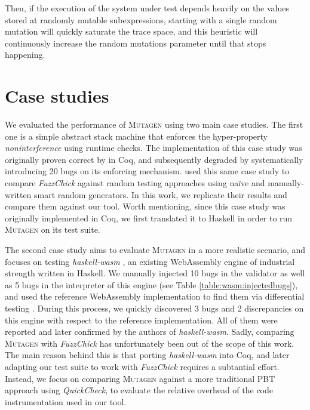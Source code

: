 \documentclass[acmsmall, anonymous]{acmart}
\newcommand{\quickcheck}{\textit{QuickCheck}\xspace}
\newcommand{\fuzzchick}{\textit{FuzzChick}\xspace}
\newcommand{\mutagen}{\textsc{Mutagen}\xspace}
\begin{document}
Then, if the execution of the system under test depends heavily on the values
stored at randomly mutable subexpressions, starting with a single random
mutation will quickly saturate the trace space, and this heuristic will
continuously increase the random mutations parameter until that stops happening.





\section{Case studies}
\label{sec:casestudies}

We evaluated the performance of \mutagen using two main case studies.
%
The first one is a simple abstract stack machine that enforces the
hyper-property \emph{noninterference} \cite{goguen1982security} using runtime
checks.
%
The implementation of this case study was originally proven correct by
\citeauthor{10.1145/2578855.2535839} \citeyearpar{10.1145/2578855.2535839} in
Coq, and subsequently degraded by systematically introducing 20 bugs on its
enforcing mechanism.
%
\citeauthor{lampropoulos2019coverage} used this same case study to compare
\fuzzchick against random testing approaches using na\"ive and manually-written
smart random generators.
%
In this work, we replicate their results and compare them against our tool.
%
Worth mentioning, since this case study was originally implemented in Coq, we
first translated it to Haskell in order to run \mutagen on its test suite.


The second case study aims to evaluate \mutagen in a more realistic scenario,
and focuses on testing \textit{haskell-wasm} \cite{haskellwasm}, an existing
WebAssembly engine of industrial strength written in Haskell.
%
We manually injected 10 bugs in the validator as well as 5 bugs in the
interpreter of this engine (see Table \ref{table:wasm:injectedbugs}), and used
the reference WebAssembly implementation to find them via differential testing
\cite{mckeeman1998differential}.
%
During this process, we quickly discovered 3 bugs and 2 discrepancies on this
engine with respect to the reference implementation.
%
All of them were reported and later confirmed by the authors of
\textit{haskell-wasm}.
%
Sadly, comparing \mutagen with \fuzzchick has unfortunately been out of the
scope of this work.
%
The main reason behind this is that porting \textit{haskell-wasm} into Coq, and
later adapting our test suite to work with \fuzzchick requires a subtantial
effort.
%
Instead, we focus on comparing \mutagen against a more traditional PBT approach
using \quickcheck, to evaluate the relative overhead of the code instrumentation
used in our tool.
\end{document}
